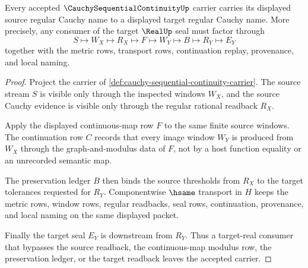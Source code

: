 \begin{theorem}
\label{thm:cauchy-sequential-continuity-cauchy-preservation}
Every accepted $\CauchySequentialContinuityUp$ carrier carries its displayed source regular Cauchy name to a displayed target regular Cauchy name. More precisely, any consumer of the target $\RealUp$ seal must factor through
$$
S
\longmapsto
W_X
\longmapsto
R_X
\longmapsto
F
\longmapsto
W_Y
\longmapsto
B
\longmapsto
R_Y
\longmapsto
E_Y
$$
together with the metric rows, transport rows, continuation replay, provenance, and local naming.
\end{theorem}
\begin{proof}
Project the carrier of \autoref{def:cauchy-sequential-continuity-carrier}. The source stream $S$ is visible only through the inspected windows $W_X$, and the source Cauchy evidence is visible only through the regular rational readback $R_X$.

Apply the displayed continuous-map row $F$ to the same finite source windows. The continuation row $C$ records that every image window $W_Y$ is produced from $W_X$ through the graph-and-modulus data of $F$, not by a host function equality or an unrecorded semantic map.

The preservation ledger $B$ then binds the source thresholds from $R_X$ to the target tolerances requested for $R_Y$. Componentwise $\hsame$ transport in $H$ keeps the metric rows, window rows, regular readbacks, seal rows, continuation, provenance, and local naming on the same displayed packet.

Finally the target seal $E_Y$ is downstream from $R_Y$. Thus a target-real consumer that bypasses the source readback, the continuous-map modulus row, the preservation ledger, or the target readback leaves the accepted carrier.
\end{proof}

